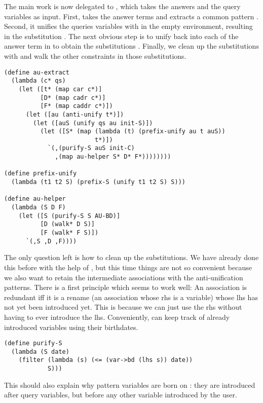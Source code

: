 The main work is now delegated to , which takes the answers and the query variables as input. First,  takes the answer terms  and extracts a common pattern . Second, it unifies the queries variables with  in the empty environment, resulting in the substitution . The next obvious step is to unify  back into each of the answer term in  to obtain the substitutions . Finally, we clean up the substitutions with  and walk the other constraints in those substitutions.
\begin{lstlisting}
(define au-extract
  (lambda (c* qs)
    (let ([t* (map car c*)]
          [D* (map cadr c*)]
          [F* (map caddr c*)])
      (let ([au (anti-unify t*)])
        (let ([auS (unify qs au init-S)])
          (let ([S* (map (lambda (t) (prefix-unify au t auS))
                         t*)])
            `(,(purify-S auS init-C)
              ,(map au-helper S* D* F*))))))))

(define prefix-unify
  (lambda (t1 t2 S) (prefix-S (unify t1 t2 S) S)))

(define au-helper
  (lambda (S D F)
    (let ([S (purify-S S AU-BD)]
          [D (walk* D S)]
          [F (walk* F S)])
      `(,S ,D ,F))))
\end{lstlisting}

The only question left is how to clean up the substitutions. We have already done this before with the help of , but this time things are not so convenient because we also want to retain the intermediate associations with the anti-unification patterns. There is a first principle which seems to work well: An association is redundant iff it is a rename (an association whose rhs is a variable) whose lhs has not yet been introduced yet. This is because we can just use the rhs without having to ever introduce the lhs. Conveniently,  can keep track of already introduced variables using their birthdates.
\begin{lstlisting}
(define purify-S
  (lambda (S date)
    (filter (lambda (s) (<= (var->bd (lhs s)) date))
            S)))
\end{lstlisting}

This should also explain why pattern variables are born on : they are introduced after query variables, but before any other variable introduced by the user.

